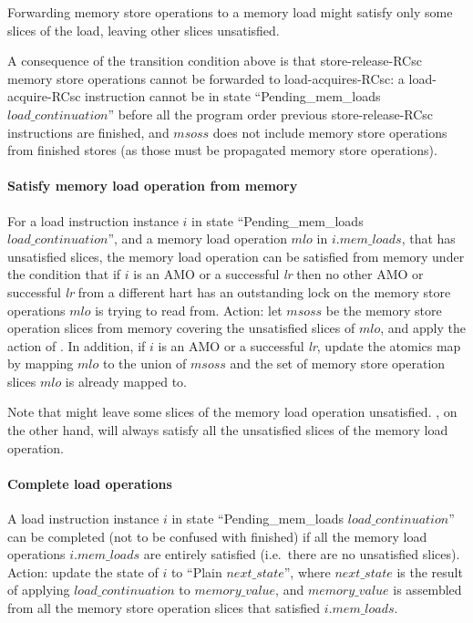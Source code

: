 \begin{commentary}
Forwarding memory store operations to a memory load might satisfy only some slices of the load, leaving other slices unsatisfied.

A consequence of the transition condition above is that store-release-RCsc memory store operations cannot be forwarded to load-acquires-RCsc:
a load-acquire-RCsc instruction cannot be in state ``{\sc Pending\_mem\_loads} $load\_continuation$'' before all the program order previous store-release-RCsc instructions are finished, and $msoss$ does not include memory store operations from finished stores (as those must be propagated memory store operations).
\end{commentary}


\paragraph{Satisfy memory load operation from memory}\label{omm:hart:sat_from_mem}
For a load instruction instance $i$ in state ``{\sc Pending\_mem\_loads} $load\_continuation$'', and a memory load operation $mlo$ in $i.mem\_loads$, that has unsatisfied slices, the memory load operation can be satisfied from memory under the condition that if $i$ is an AMO or a successful {\em lr} then no other AMO or successful {\em lr} from a different hart has an outstanding lock on the memory store operations $mlo$ is trying to read from.
Action: let $msoss$ be the memory store operation slices from memory covering the unsatisfied slices of $mlo$, and apply the action of .
In addition, if $i$ is an AMO or a successful {\em lr}, update the atomics map by mapping $mlo$ to the union of $msoss$ and the set of memory store operation slices $mlo$ is already mapped to.

\begin{commentary}
Note that  might leave some slices of the memory load operation unsatisfied.
, on the other hand, will always satisfy all the unsatisfied slices of the memory load operation.
\end{commentary}


\paragraph{Complete load operations}\label{omm:hart:complete_loads}
A load instruction instance $i$ in state ``{\sc Pending\_mem\_loads} $load\_continuation$'' can be completed (not to be confused with finished) if all the memory load operations $i.mem\_loads$ are entirely satisfied (i.e.~there are no unsatisfied slices).
Action: update the state of $i$ to ``{\sc Plain} $next\_state$'', where $next\_state$ is the result of applying $load\_continuation$ to $memory\_value$, and $memory\_value$ is assembled from all the memory store operation slices that satisfied $i.mem\_loads$.



